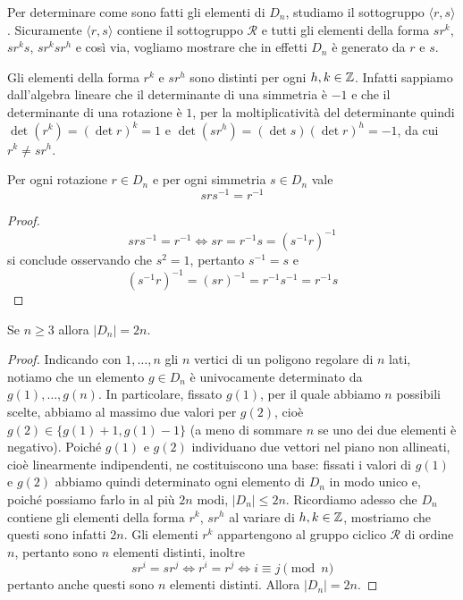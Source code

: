\documentclass[11pt]{scrartcl}
\begin{document}
Per determinare come sono fatti gli elementi di $D_n$, studiamo il sottogruppo
$\langle r, s\rangle$. Sicuramente $\langle r, s\rangle$ contiene il sottogruppo $\mathcal{R}$
e tutti gli elementi della forma $sr^k$, $sr^ks$, $sr^ksr^h$ e così via, vogliamo
mostrare che in effetti $D_n$ è generato da $r$ e $s$.

\begin{remark}
    Gli elementi della forma $r^k$ e $sr^h$ sono distinti per ogni $h, k \in \mathbb Z$. 
    Infatti sappiamo dall'algebra lineare che il determinante di una simmetria
    è $-1$ e che il determinante di una rotazione è $1$, per la moltiplicatività
    del determinante quindi $\det (r^k) = (\det r)^k = 1$ e
    $\det (sr^h) = (\det s)(\det r)^h = -1$, da cui $r^k \neq sr^h$.
\end{remark}

\begin{lemma}
    Per ogni rotazione $r \in D_n$ e per ogni simmetria $s \in D_n$ vale
    \[srs^{-1} = r^{-1}\]
\end{lemma}

\begin{proof}
    \[
        srs^{-1} = r^{-1} \iff sr = r^{-1}s = (s^{-1}r)^{-1}
    \] si conclude
    osservando che $s^2 = 1$, pertanto $s^{-1} = s$ e 
    \[
        (s^{-1}r)^{-1} = (sr)^{-1} = r^{-1}s^{-1} = r^{-1}s
    \]
\end{proof}

\begin{proposition}
    Se $n \geqslant 3$ allora $|D_n| = 2n$.
\end{proposition}

\begin{proof}
    Indicando con $1, \ldots, n$ gli $n$ vertici di un poligono regolare di $n$ lati, notiamo
    che un elemento $g \in D_n$ è univocamente determinato da $g(1), \ldots, g(n)$.
    In particolare, fissato $g(1)$, per il quale abbiamo $n$ possibili scelte,
    abbiamo al massimo due valori per $g(2)$, cioè $g(2) \in \{g(1) + 1, g(1) - 1\}$
    (a meno di sommare $n$ se uno dei due elementi è negativo). Poiché $g(1)$
    e $g(2)$ individuano due vettori nel piano non allineati, cioè
    linearmente indipendenti, ne costituiscono una base: fissati i valori di 
    $g(1)$ e $g(2)$ abbiamo quindi determinato ogni
    elemento di $D_n$ in modo unico e, poiché possiamo farlo in al più $2n$ modi, 
    $|D_n| \leqslant 2n$. Ricordiamo adesso che $D_n$ contiene gli elementi
    della forma $r^k$, $sr^h$ al variare di $h, k \in \mathbb Z$, mostriamo che questi sono 
    infatti $2n$. Gli elementi $r^k$ appartengono al gruppo ciclico $\mathcal{R}$
    di ordine $n$, pertanto sono $n$ elementi distinti, inoltre 
    \[
        sr^i = sr^j \iff r^i = r^j\iff i \equiv j \pmod n
    \] pertanto anche questi sono $n$
    elementi distinti. Allora $|D_n| = 2n$.
\end{proof}
\end{document}
